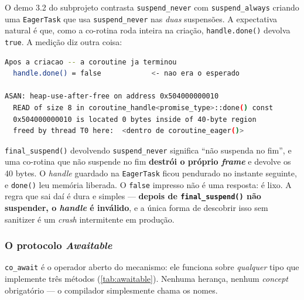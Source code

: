 \begin{armadilha}
O demo 3.2 do subprojeto contrasta \texttt{suspend\_never} com
\texttt{suspend\_always} criando uma \texttt{EagerTask} que usa
\texttt{suspend\_never} nas \emph{duas} suspensões. A expectativa natural é que,
como a co-rotina roda inteira na criação, \texttt{handle.done()} devolva
\texttt{true}. A medição diz outra coisa:

\begin{lstlisting}[style=bt, language=bash,
    caption={Saída de \texttt{dist/bin/coroutines}, demo 3.2 --- e o motivo,
             sob \texttt{-fsanitize=address}.}]
  Apos a criacao -- a coroutine ja terminou
  handle.done() = false            <- nao era o esperado

ASAN: heap-use-after-free on address 0x504000000010
  READ of size 8 in coroutine_handle<promise_type>::done() const
  0x504000000010 is located 0 bytes inside of 40-byte region
  freed by thread T0 here:  <dentro de coroutine_eager()>
\end{lstlisting}

\texttt{final\_suspend()} devolvendo \texttt{suspend\_never} significa ``não
suspenda no fim'', e uma co-rotina que não suspende no fim \textbf{destrói o
próprio \emph{frame}} e devolve os 40 bytes. O \emph{handle} guardado na
\texttt{EagerTask} ficou pendurado no instante seguinte, e \texttt{done()} leu
memória liberada. O \texttt{false} impresso não é uma resposta: é lixo. A regra
que sai daí é dura e simples --- \textbf{depois de \texttt{final\_suspend()} não
suspender, o \emph{handle} é inválido}, e a única forma de descobrir isso sem
sanitizer é um \emph{crash} intermitente em produção.
\end{armadilha}

\subsubsection{O protocolo \emph{Awaitable}}

\texttt{co\_await} é o operador aberto do mecanismo: ele funciona sobre
\emph{qualquer} tipo que implemente três métodos
(\cref{tab:awaitable}). Nenhuma herança, nenhum \emph{concept} obrigatório ---
o compilador simplesmente chama os nomes.

